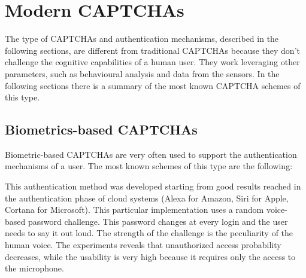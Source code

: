 \section{Modern CAPTCHAs}
The type of CAPTCHAs and authentication mechanisms, described in the following sections, are different from traditional CAPTCHAs because they don't challenge the cognitive capabilities of a human user. They work leveraging other parameters, such as behavioural analysis and data from the sensors. In the following sections there is a summary of the most known CAPTCHA schemes of this type.

\subsection{Biometrics-based CAPTCHAs}\label{soa:Bio_CAPTCHA}
Biometric-based CAPTCHAs are very often used to support the authentication mechanisms of a user. The most known schemes of this type are the following:
\begin{itemize}
{This authentication method was developed starting from good results reached in the authentication phase of cloud systems\cite{voice_CAPTCHA} (Alexa for Amazon, Siri for Apple, Cortana for Microsoft). This particular implementation uses a random voice-based password challenge. This password changes at every login and the user needs to say it out loud. The strength of the challenge is the peculiarity of the human voice. The experiments reveals that unauthorized access probability decreases, while the usability is very high because it requires only the access to the microphone.}
\end{itemize}

